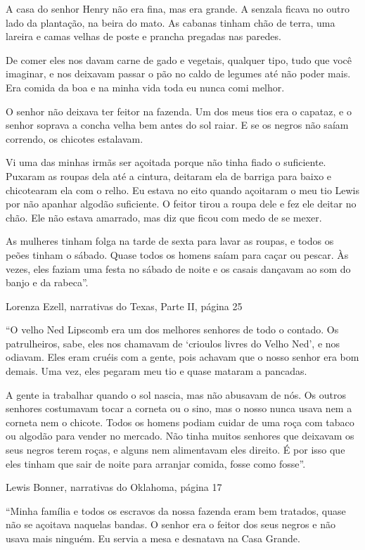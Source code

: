 A casa do senhor Henry não era fina, mas era grande. A senzala ficava no
outro lado da plantação, na beira do mato. As cabanas tinham chão de
terra, uma lareira e camas velhas de poste e prancha pregadas nas
paredes.

De comer eles nos davam carne de gado e vegetais, qualquer tipo, tudo
que você imaginar, e nos deixavam passar o pão no caldo de legumes até
não poder mais. Era comida da boa e na minha vida toda eu nunca comi
melhor.

O senhor não deixava ter feitor na fazenda. Um dos meus tios era o
capataz, e o senhor soprava a concha velha bem antes do sol raiar. E se
os negros não saíam correndo, os chicotes estalavam.

Vi uma das minhas irmãs ser açoitada porque não tinha fiado o
suficiente. Puxaram as roupas dela até a cintura, deitaram ela de
barriga para baixo e chicotearam ela com o relho. Eu estava no eito
quando açoitaram o meu tio Lewis por não apanhar algodão suficiente. O
feitor tirou a roupa dele e fez ele deitar no chão. Ele não estava
amarrado, mas diz que ficou com medo de se mexer.

As mulheres tinham folga na tarde de sexta para lavar as roupas, e todos
os peões tinham o sábado. Quase todos os homens saíam para caçar ou
pescar. Às vezes, eles faziam uma festa no sábado de noite e os casais
dançavam ao som do banjo e da rabeca''.

Lorenza Ezell, narrativas do Texas, Parte II, página 25

``O velho Ned Lipscomb era um dos melhores senhores de todo o contado.
Os patrulheiros, sabe, eles nos chamavam de `crioulos livres do Velho
Ned', e nos odiavam. Eles eram cruéis com a gente, pois achavam que o
nosso senhor era bom demais. Uma vez, eles pegaram meu tio e quase
mataram a pancadas.

A gente ia trabalhar quando o sol nascia, mas não abusavam de nós. Os
outros senhores costumavam tocar a corneta ou o sino, mas o nosso nunca
usava nem a corneta nem o chicote. Todos os homens podiam cuidar de uma
roça com tabaco ou algodão para vender no mercado. Não tinha muitos
senhores que deixavam os seus negros terem roças, e alguns nem
alimentavam eles direito. É por isso que eles tinham que sair de noite
para arranjar comida, fosse como fosse''.

Lewis Bonner, narrativas do Oklahoma, página 17

``Minha família e todos os escravos da nossa fazenda eram bem tratados,
quase não se açoitava naquelas bandas. O senhor era o feitor dos seus
negros e não usava mais ninguém. Eu servia a mesa e desnatava na Casa
Grande.

